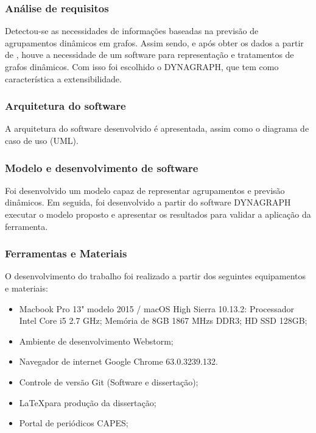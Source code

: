 \subsubsection{Análise de requisitos}
Detectou-se as necessidades de informações baseadas na previsão de agrupamentos dinâmicos
em grafos. Assim sendo, e após obter os dados a partir de \cite{simda}, houve a necessidade de um software para
representação e tratamentos de grafos dinâmicos. Com isso foi escolhido o DYNAGRAPH, que tem como 
característica a extensibilidade.

\subsubsection{Arquitetura do software}
A arquitetura do software desenvolvido é apresentada, assim como o diagrama de caso de uso (UML).

\subsubsection{Modelo e desenvolvimento de software}
Foi desenvolvido um modelo capaz de representar agrupamentos e previsão dinâmicos.
Em seguida, foi desenvolvido a partir do software DYNAGRAPH executar o modelo
proposto e apresentar os resultados para validar a aplicação da ferramenta.

\subsubsection{Ferramentas e Materiais}
O desenvolvimento do trabalho foi realizado a partir dos seguintes equipamentos e materiais:
\begin{itemize}
	\item Macbook Pro 13" modelo 2015 / macOS High Sierra 10.13.2:
	\subitem Processador Intel Core i5 2.7 GHz;
	\subitem Memória de 8GB 1867 MHzs DDR3;
	\subitem HD SSD 128GB;
	\item Ambiente de desenvolvimento Webstorm;
	\item Navegador de internet Google Chrome 63.0.3239.132.
	\item Controle de versão Git (Software e dissertação);
	\item \LaTeX para produção da dissertação;
	\item Portal de periódicos CAPES;
\end{itemize}


